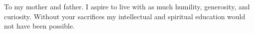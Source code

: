 
\noindent To my mother and father. I aspire to live with as much humility, generosity, and curiosity. Without your sacrifices my intellectual and spiritual education would not have been possible.